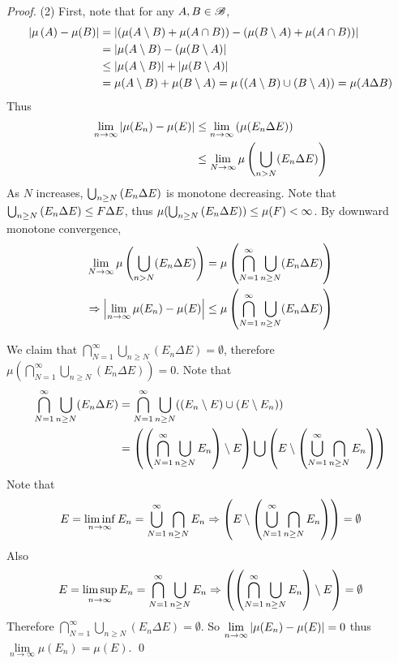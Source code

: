 \documentclass[11pt]{article}
\begin{document}
\begin{itemize}
\begin{proof}
(2) First, note that for any $A, B \in {\mathscr B}$,
\begin{align*}
\left\lvert \mu\left(A\right) - \mu(B) \right\rvert &= \left\lvert (\mu(A \setminus B) + \mu(A \cap B) ) - (\mu(B \setminus A) + \mu(A \cap B) ) \right\rvert \\
&= \left\lvert \mu(A \setminus B)  - (\mu(B \setminus A)  \right\rvert\\
& \le \left\lvert \mu(A \setminus B)  \right\rvert + \left\lvert \mu(B \setminus A) \right\rvert\\
& = \mu(A \setminus B)  + \mu(B \setminus A) = \mu\left((A \setminus B)  \cup (B \setminus A)\right) = \mu(A \Delta B)
\end{align*}
Thus
\begin{align*}
\lim\limits_{n \rightarrow \infty} \left\lvert \mu(E_n) - \mu(E) \right\rvert &\le \lim\limits_{n \rightarrow \infty}\left( \mu(E_n \Delta E)\right)\\
&\le  \lim\limits_{N \rightarrow \infty} \mu\left(\bigcup_{n>N}(E_n \Delta E)\right)
\end{align*}
As $N$ increases, $\bigcup_{n \ge N}\left(E_n \Delta E\right)$ is monotone decreasing. Note that $\bigcup_{n \ge N}\left(E_n \Delta E\right) \le F \Delta E$, thus $\mu(\bigcup_{n \ge N}\left(E_n \Delta E\right)) \le \mu(F) <\infty$. By downward monotone convergence,
\begin{align*}
 \lim\limits_{N \rightarrow \infty} \mu\left(\bigcup_{n>N}(E_n \Delta E)\right) &=  \mu\left(\bigcap_{N=1}^{\infty}\bigcup_{n\ge N}(E_n\Delta E)\right)\\
\Rightarrow  \left\lvert \lim\limits_{n \rightarrow \infty} \mu(E_n) - \mu(E) \right\rvert &\le \mu\left(\bigcap_{N=1}^{\infty}\bigcup_{n\ge N}(E_n\Delta E)\right)
\end{align*}

We claim that $\bigcap_{N=1}^{\infty}\bigcup_{n\ge N}(E_n\Delta E) = \emptyset$, therefore $\mu(\bigcap_{N=1}^{\infty}\bigcup_{n\ge N}(E_n\Delta E)) = 0$.  Note that 
\begin{align*}
\bigcap_{N=1}^{\infty}\bigcup_{n\ge N}(E_n\Delta E) &= \bigcap_{N=1}^{\infty}\bigcup_{n\ge N}((E_n \setminus E) \cup (E\setminus E_n))\\
&= \left( \left(\bigcap_{N=1}^{\infty}\bigcup_{n\ge N}E_n\right) \setminus E\right) \bigcup \left(E \setminus \left( \bigcup_{N=1}^{\infty}\bigcap_{n\ge N} E_n\right) \right)
\end{align*}
Note that 
\begin{align*}
E = \liminf_{n\rightarrow \infty}E_n = \bigcup_{N=1}^{\infty}\bigcap_{n\ge N} E_n \Rightarrow \left(E \setminus \left( \bigcup_{N=1}^{\infty}\bigcap_{n\ge N} E_n\right) \right) = \emptyset
\end{align*}
Also 
\begin{align*}
E = \limsup_{n\rightarrow \infty}E_n = \bigcap_{N=1}^{\infty}\bigcup_{n\ge N} E_n \Rightarrow \left( \left(\bigcap_{N=1}^{\infty}\bigcup_{n\ge N}E_n\right) \setminus E\right) = \emptyset
\end{align*}
Therefore $\bigcap_{N=1}^{\infty}\bigcup_{n\ge N}(E_n\Delta E) = \emptyset$. So $\lim\limits_{n \rightarrow \infty}\left\lvert  \mu(E_n) - \mu(E) \right\rvert = 0$ thus $\lim\limits_{n \rightarrow \infty} \mu(E_n) = \mu(E)$. \qed
\end{proof}


\end{itemize}
\end{document}
